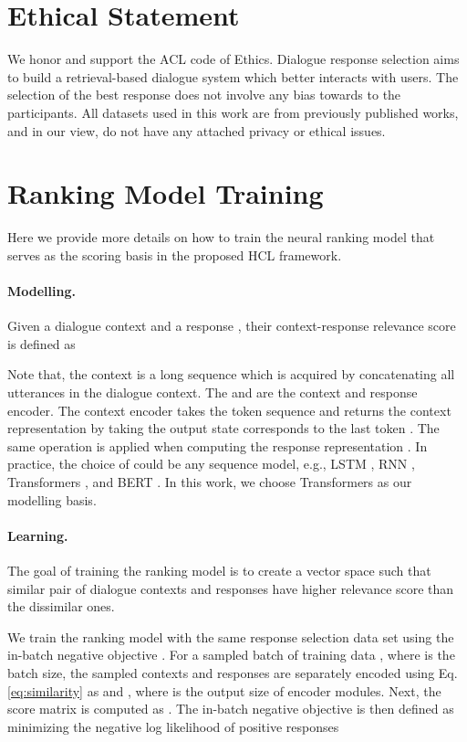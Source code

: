\documentclass[11pt,a4paper]{article}
\begin{document}
\section*{Ethical Statement}
We honor and support the ACL code of Ethics. Dialogue response selection aims to build a retrieval-based dialogue system which better interacts with users. The selection of the best response does not involve any bias towards to the participants. All datasets used in this work are from previously published works, and in our view, do not have any attached privacy or ethical issues. 





\clearpage
\appendix
\section{Ranking Model Training}
Here we provide more details on how to train the neural ranking model  that serves as the scoring basis in the proposed HCL framework.

\paragraph{Modelling.} Given a dialogue context  and a response , their context-response relevance score is defined as 

Note that, the context  is a long sequence which is acquired by concatenating all utterances in the dialogue context. The  and  are the context and response encoder. The context encoder  takes the token sequence  and returns the context representation  by taking the output state corresponds to the last token . The same operation is applied when computing the response representation . In practice, the choice of  could be any sequence model, e.g., LSTM \cite{DBLP:journals/neco/HochreiterS97}, RNN \cite{DBLP:journals/cogsci/Elman90},  Transformers \cite{DBLP:conf/nips/VaswaniSPUJGKP17}, and BERT \cite{DBLP:conf/naacl/DevlinCLT19}. In this work, we choose Transformers as our modelling basis.

\paragraph{Learning.} The goal of training the ranking model is to create a vector space such that similar pair of dialogue contexts and responses have higher relevance score than the dissimilar ones. 

We train the ranking model with the same response selection data set  using the in-batch negative objective \cite{DBLP:conf/emnlp/KarpukhinOMLWEC20}. For a sampled batch of training data , where  is the batch size, the sampled contexts and responses are separately encoded using Eq. \eqref{eq:similarity} as  and , where  is the output size of encoder modules. Next, the score matrix  is computed as . The in-batch negative objective \cite{DBLP:conf/emnlp/KarpukhinOMLWEC20} is then defined as minimizing the negative log likelihood of positive responses
\end{document}
